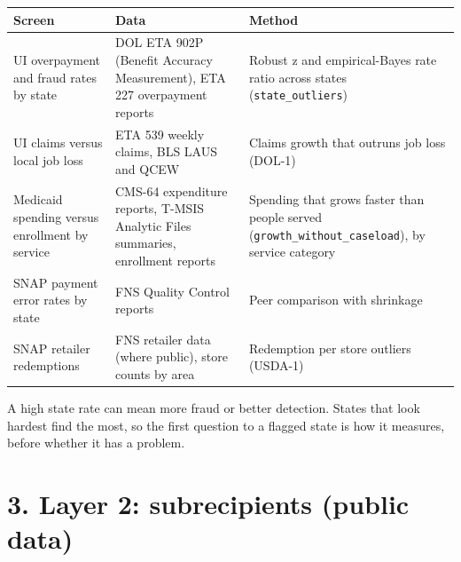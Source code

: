 \documentclass[letterpaper,11pt]{article}
\begin{document}
\begingroup\small\setlength{\tabcolsep}{4pt}\renewcommand{\arraystretch}{1.25}
\begin{longtable}[l]{@{}>{\raggedright\arraybackslash}p{}>{\raggedright\arraybackslash}p{}>{\raggedright\arraybackslash}p{}@{}}
\rowcolor{coolblack}\leavevmode\color{white}\bfseries Screen & \leavevmode\color{white}\bfseries Data & \leavevmode\color{white}\bfseries Method \\
\endhead
UI overpayment and fraud rates by state & DOL ETA 902P (Benefit Accuracy Measurement), ETA 227 overpayment reports & Robust z and empirical-Bayes rate ratio across states (\texttt{state\_outliers}) \\
UI claims versus local job loss & ETA 539 weekly claims, BLS LAUS and QCEW & Claims growth that outruns job loss (DOL-1) \\
Medicaid spending versus enrollment by service & CMS-64 expenditure reports, T-MSIS Analytic Files summaries, enrollment reports & Spending that grows faster than people served (\texttt{growth\_without\_caseload}), by service category \\
SNAP payment error rates by state & FNS Quality Control reports & Peer comparison with shrinkage \\
SNAP retailer redemptions & FNS retailer data (where public), store counts by area & Redemption per store outliers (USDA-1) \\
\end{longtable}\endgroup

A high state rate can mean more fraud or better detection. States that
look hardest find the most, so the first question to a flagged state is
how it measures, before whether it has a problem.

\hypertarget{layer-2-subrecipients-public-data}{%
\section*{3. Layer 2: subrecipients (public
data)}\label{layer-2-subrecipients-public-data}}
\end{document}
